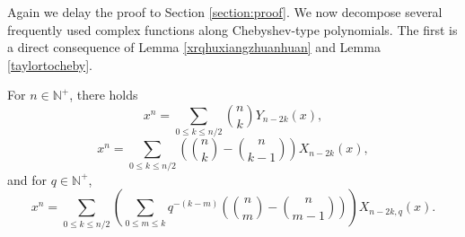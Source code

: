 \documentclass{article}
\begin{document}
Again we delay the proof to Section \ref{section:proof}. We now decompose several frequently used complex functions along Chebyshev-type polynomials. The first is a direct consequence of Lemma \ref{xrqhuxiangzhuanhuan} and Lemma \ref{taylortocheby}.


\begin{lemma}\label{decompositionofpower}
    For $n\in \mathbb{N}^+$,
    there holds
    \begin{equation}
        x^n=\sum_{0\leq k\leq n/2}\binom{n}{k}Y_{n-2k}(x),
    \end{equation}
    \begin{equation}
        x^n=\sum_{0\leq k\leq n/2}\left(\binom{n}{k}-\binom{n}{k-1}\right) X_{n-2k}(x),
    \end{equation}
    and for $q\in \mathbb{N}^+$,
    \begin{equation}
        x^n=\sum_{0\leq k\leq n/2} \left(\sum_{0\leq m\leq k}
        q^{-(k-m)}\left(\binom{n}{m}-\binom{n}{m-1}\right)\right)X_{n-2k,q}(x).
    \end{equation}
\end{lemma}
\end{document}
